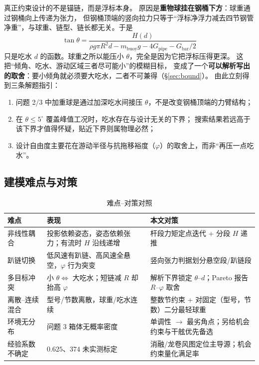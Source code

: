 \documentclass[UTF8,a4paper,zihao=-4]{ctexart}
\begin{document}
真正约束设计的不是锚链，而是浮标本身。
原因是\textbf{重物球挂在钢桶下方}：球重通过钢桶向上传递为张力，
但钢桶顶端的竖向拉力只等于“浮标净浮力减去四节钢管净重”，与球重、链型、链长都无关。于是
\begin{equation}\label{eq:key}
\tan\theta=\frac{H(d)}{\rho g\pi R^2 d-m_{\mathrm{buoy}}g-4G_{\mathrm{pipe}}-G_{\mathrm{bar}}/2}
\end{equation}
只是吃水 \(d\) 的函数。球重之所以能压小 \(\theta\)，完全是因为它把浮标压得更深。
这把“倾角、吃水、游动区域三者尽可能小”的模糊目标，
变成了一个\textbf{可以解析写出的取舍}：要小倾角就必须要大吃水，二者不可兼得（\S\ref{sec:bound}）。
由此立刻得到三条解题指引：
\begin{enumerate}[leftmargin=1.6em,itemsep=0.15em]
  \item 问题 2/3 中加重球是通过加深吃水间接压 \(\theta\)，不是改变钢桶顶端的力臂结构；
  \item 在 \(\theta\le5^\circ\) 覆盖峰值工况时，吃水存在与设计无关的下界；
        搜索结果若远高于该下界才值得怀疑，贴近下界则属物理必然；
  \item 设计自由度主要花在游动半径与抗拖移裕度（\(\varphi\)）的取舍上，而非“再压一点吃水”。
\end{enumerate}

\subsection{建模难点与对策}

\begin{table}[H]
\centering
\caption{难点--对策对照}
\footnotesize
\begin{tabularx}{\textwidth}{>{\raggedright\arraybackslash}p{2.2cm}XX}
\toprule
难点 & 表现 & 本文对策 \\
\midrule
非线性耦合 & 投影依赖姿态，姿态依赖张力；有流时 \(H\) 沿线递增 &
杆段力矩定点迭代 + 分段 \(H\) 递推 \\
趴链切换 & 低风速有趴链、高风速全悬空，\(\varphi\) 行为突变 &
竖向张力判据划分悬空段/趴链段 \\
多目标冲突 & 小 \(\theta\Leftrightarrow\) 大吃水；短链减 \(R\) 却抬高 \(\varphi\) &
解析下界锁定 \(\theta\)--\(d\)；Pareto 报告 \(R\)--\(\varphi\) 取舍 \\
离散--连续混合 & 型号/节数离散，球重/吃水连续 &
整数节约束 + 对固定（型号，节数）二分最轻球重 \\
环境无分布 & 问题 3 箱体无概率密度 &
单调性 \(\to\) 最劣角点；另给机会约束与干舷优先备选 \\
经验系数不确定 & \(0.625\)、\(374\) 未实测标定 &
消融/龙卷风图定位主导源；机会约束量化满足率 \\
\bottomrule
\end{tabularx}
\end{table}
\end{document}
